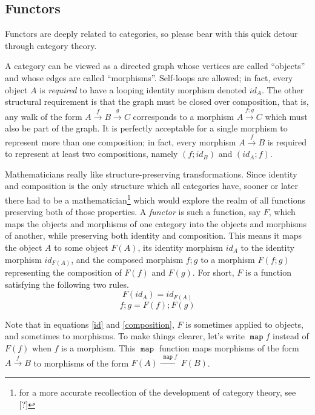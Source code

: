 \documentclass{article}
\newcommand{\map}{\ensuremath{\mathop{\mathtt{map}}}}
\begin{document}
\begin{multicols}{2}
\section{Functors}\label{functor}
\vspace{-\parskip}\hspace*{\parindent}Functors are deeply related to categories, so please bear with this quick detour through category theory.

A category can be viewed as a directed graph whose vertices are called ``objects'' and whose edges are called ``morphisms''. Self-loops are allowed; in fact, every object $A$ is \emph{required} to have a looping identity morphism denoted $id_A$. The other structural requirement is that the graph must be closed over composition, that is, any walk of the form $A \stackrel{f}{\longrightarrow} B \stackrel{g}{\longrightarrow} C$ corresponds to a morphism $A \stackrel{f;g}{\longrightarrow} C$ which must also be part of the graph. It is perfectly acceptable for a single morphism to represent more than one composition; in fact, every morphism $A \stackrel{f}{\longrightarrow} B$ is required to represent at least two compositions, namely $(f;id_B)$ and $(id_A;f)$.

Mathematicians really like structure-preserving transformations. Since identity and composition is the only structure which all categories have, sooner or later there had to be a mathematician\footnote{for a more accurate recollection of the development of category theory, see [?]} which would explore the realm of all functions preserving both of those properties. A \emph{functor} is such a function, say $F$, which maps the objects and morphisms of one category into the objects and morphisms of another, while preserving both identity and composition. This means it maps the object $A$ to some object $F(A)$, its identity morphism $id_A$ to the identity morphism $id_{F(A)}$, and the composed morphism $f;g$ to a morphism $F(f;g)$ representing the composition of $F(f)$ and $F(g)$. For short, $F$ is a function satisfying the following two rules.
\begin{equation}\label{id}
F(id_A) = id_{F(A)}
\end{equation}
\begin{equation}\label{composition}
f;g = F(f);F(g)
\end{equation}

Note that in equations \ref{id} and \ref{composition}, $F$ is sometimes applied to objects, and sometimes to morphisms. To make things clearer, let's write $\map f$ instead of $F(f)$ when $f$ is a morphism. This $\map$ function maps morphisms of the form $A \stackrel{f}{\longrightarrow} B$ to morphisms of the form $F(A) \xrightarrow{~\map f~} F(B)$.


\end{multicols}
\end{document}
